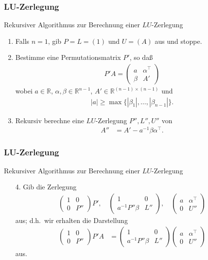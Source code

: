 \documentclass{beamer}
\newcommand\RR{\mathbb R}
\newcommand{\trans}{\top}
\newcommand{\mytitle}{LU-Zerlegung}
\begin{document}
\begin{frame}\frametitle{\mytitle}
	\begin{block}{Rekursiver Algorithmus zur Berechnung einer $LU$-Zerlegung}
		\begin{enumerate}
			\item Falls $n=1$, gib $P=L=(1)$ und $U=(A)$ aus und stoppe.
			\item Bestimme eine Permutationsmatrix $P'$, so da\ss
				\begin{align*}
					P'A=\begin{pmatrix}a&\alpha^\trans\\\beta&A'\end{pmatrix}
				\end{align*}
				wobei $a\in\RR$, $\alpha,\beta\in\RR^{n-1}$, $A'\in\RR^{(n-1)\times(n-1)}$ und
				\begin{align*}
					|a|\geq\max\{|\beta_1|,\ldots,|\beta_{n-1}|\}.
				\end{align*}
			\item Rekursiv berechne eine $LU$-Zerlegung $P'',L'',U''$ von
				\begin{align*}
					A''&=A'-a^{-1}\beta\alpha^\trans.
				\end{align*}
		\end{enumerate}
	\end{block}
\end{frame}

\begin{frame}\frametitle{\mytitle}
	\begin{block}{Rekursiver Algorithmus zur Berechnung einer $LU$-Zerlegung}
		\begin{enumerate}
			\item[4.] Gib die Zerlegung
				\begin{align*}
					\begin{pmatrix}1&0\\0&P''\end{pmatrix}P',\quad\begin{pmatrix} 1&0\\a^{-1}P''\beta&L'' \end{pmatrix},\quad\begin{pmatrix} a&\alpha^\trans\\0&U'' \end{pmatrix}
				\end{align*}
				aus; d.h.\ wir erhalten die Darstellung
				\begin{align*}
					\begin{pmatrix}1&0\\0&P''\end{pmatrix}P'A&=
				\begin{pmatrix} 1&0\\a^{-1}P''\beta&L'' \end{pmatrix}\begin{pmatrix} a&\alpha^\trans\\0&U'' \end{pmatrix}
				\end{align*}
				aus.
		\end{enumerate}
	\end{block}
\end{frame}
\end{document}
